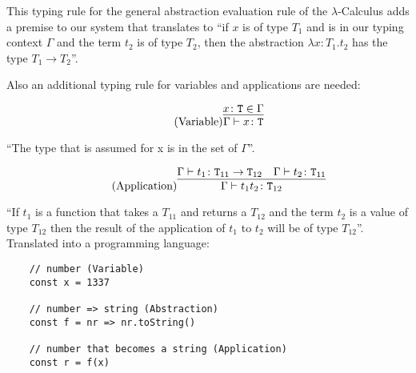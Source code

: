 This typing rule for the general abstraction evaluation rule
of the $\lambda$-Calculus  adds
a premise to our system that translates to ``if $x$ is of
type $T_1$ and is in our typing context $\Gamma$ and
the term $t_2$ is of type $T_2$, then the abstraction
$\lambda x \colon T_1 . t_2$ has the type $T_1 \rightarrow T_2$''.

Also an additional typing rule for variables and applications
are needed:

\begin{equation*}
    \tag{Variable}
    \infer{
        \Gamma \vdash x \colon \texttt{T}
    }{
        x \colon \texttt{T} \in \Gamma
    }
\end{equation*}

``The type that is assumed for x is in the set of $\Gamma$''.

\begin{equation*}
    \tag{Application}
    \infer{
        \Gamma \vdash t_1 t_2 \colon \texttt{T}_{12}
    }{
        \Gamma \vdash t_1 \colon \texttt{T}_{11} \rightarrow \texttt{T}_{12}
        &
        \Gamma \vdash t_2 \colon \texttt{T}_{11}
    }
\end{equation*}

``If $t_1$ is a function that takes a $T_{11}$ and returns a
$T_{12}$ and the term $t_2$ is a value of type $T_{12}$ then
the result of the application of $t_1$ to $t_2$ will
be of type $T_{12}$''.
\\[12pt]
Translated into a programming language:

\begin{verbatim}
    // number (Variable)
    const x = 1337

    // number => string (Abstraction)
    const f = nr => nr.toString()

    // number that becomes a string (Application)
    const r = f(x)
\end{verbatim}
